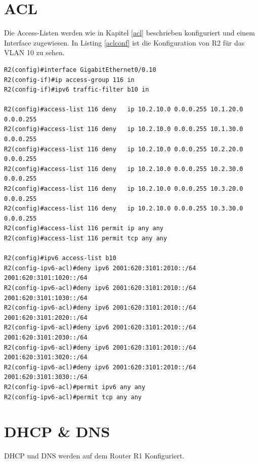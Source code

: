 \documentclass[11pt,a4paper]{scrreprt}
\begin{document}
\section{ACL}
Die Access-Listen werden wie in Kapitel \ref{acl} beschrieben konfiguriert und einem Interface zugewiesen. In Listing \ref{aclconf} ist die Konfiguration von R2 für das \acs{VLAN} 10 zu sehen.
\newline
\begin{lstlisting}[frame=single, breaklines=true, captionpos=b,caption= ACL,label=aclconf]
R2(config)#interface GigabitEthernet0/0.10
R2(config-if)#ip access-group 116 in
R2(config-if)#ipv6 traffic-filter b10 in

R2(config)#access-list 116 deny   ip 10.2.10.0 0.0.0.255 10.1.20.0 0.0.0.255
R2(config)#access-list 116 deny   ip 10.2.10.0 0.0.0.255 10.1.30.0 0.0.0.255
R2(config)#access-list 116 deny   ip 10.2.10.0 0.0.0.255 10.2.20.0 0.0.0.255
R2(config)#access-list 116 deny   ip 10.2.10.0 0.0.0.255 10.2.30.0 0.0.0.255
R2(config)#access-list 116 deny   ip 10.2.10.0 0.0.0.255 10.3.20.0 0.0.0.255
R2(config)#access-list 116 deny   ip 10.2.10.0 0.0.0.255 10.3.30.0 0.0.0.255
R2(config)#access-list 116 permit ip any any
R2(config)#access-list 116 permit tcp any any

R2(config)#ipv6 access-list b10
R2(config-ipv6-acl)#deny ipv6 2001:620:3101:2010::/64 2001:620:3101:1020::/64
R2(config-ipv6-acl)#deny ipv6 2001:620:3101:2010::/64 2001:620:3101:1030::/64
R2(config-ipv6-acl)#deny ipv6 2001:620:3101:2010::/64 2001:620:3101:2020::/64
R2(config-ipv6-acl)#deny ipv6 2001:620:3101:2010::/64 2001:620:3101:2030::/64
R2(config-ipv6-acl)#deny ipv6 2001:620:3101:2010::/64 2001:620:3101:3020::/64
R2(config-ipv6-acl)#deny ipv6 2001:620:3101:2010::/64 2001:620:3101:3030::/64
R2(config-ipv6-acl)#permit ipv6 any any
R2(config-ipv6-acl)#permit tcp any any
\end{lstlisting}
\newpage

\section{DHCP \& DNS}
\acs{DHCP} und \acs{DNS} werden auf dem Router R1 Konfiguriert.
\end{document}
